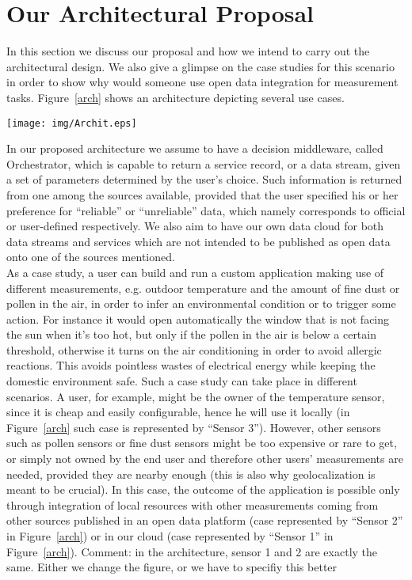 \section{Our Architectural Proposal}
\label{sec:casestudy}
In this section we discuss our proposal and how we intend to carry out the architectural design.
We also give a glimpse on the case studies for this scenario in order to show why would someone use open data integration for measurement tasks. Figure~\ref{arch} shows an architecture depicting several use cases.

\begin{figure*}[!t]
\centering
\texttt{[image: img/Archit.eps]} 
\caption{Our proposed architecture.}
\label{arch}
\end{figure*}

In our proposed architecture we assume to have a decision middleware, called Orchestrator, which is capable to return a service record, or a data stream, given a set of parameters determined by the user's choice.
Such information is returned from one among the sources available, provided that the user specified his or her preference for ``reliable'' or ``unreliable'' data, which namely corresponds to official or user-defined respectively.
We also aim to have our own data cloud for both data streams and services which are not intended to be published as open data onto one of the sources mentioned.
\\

As a case study, a user can build and run a custom application making use of different measurements, e.g. outdoor temperature and the amount of fine dust or pollen in the air, in order to infer an environmental condition or to trigger some action.
For instance it would open automatically the window that is not facing the sun when it's too hot, but only if the pollen in the air is below a certain threshold, otherwise it turns on the air conditioning in order to avoid allergic reactions.
This avoids pointless wastes of electrical energy while keeping the domestic environment safe.
Such a case study can take place in different scenarios.
A user, for example, might be the owner of the temperature sensor, since it is cheap and easily configurable, hence he will use it locally (in Figure~\ref{arch} such case is represented by ``Sensor 3'').
However, other sensors such as pollen sensors or fine dust sensors might be too expensive or rare to get, or simply not owned by the end user and therefore other users' measurements are needed, provided they are nearby enough (this is also why geolocalization is meant to be crucial).
In this case, the outcome of the application is possible only through integration of local resources with other measurements coming from other sources published in an open data platform (case represented by ``Sensor 2'' in Figure~\ref{arch}) or in our cloud (case represented by ``Sensor 1'' in Figure~\ref{arch}). \color{red}Comment: in the architecture, sensor 1 and 2 are exactly the same. Either we change the figure, or we have to specifiy this better\color{black}
\\

